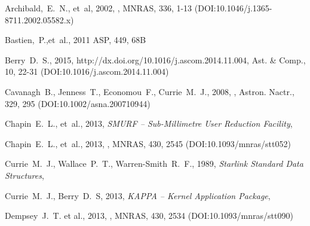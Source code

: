 \documentclass[11pt,oneside,chapters]{starlink}
\begin{document}
\newpage

\newpage

\newpage

\newpage

\newpage

\newpage

\newpage
\begin{thebibliography}{}



Archibald,~E.~N., et~al, 2002, , MNRAS, 336, 1-13
(DOI:10.1046/j.1365-8711.2002.05582.x)

Bastien,~P.,et~al., 2011   ASP, 449, 68B 

Berry~D.~S.,  2015,
{http://dx.doi.org/10.1016/j.ascom.2014.11.004},
Ast. \& Comp., 10, 22-31 (DOI:10.1016/j.ascom.2014.11.004)

Cavanagh~B., Jenness~T., Economou~F., Currie~M.~J., 2008,
, Astron. Nactr., 329, 295
(DOI:10.1002/asna.200710944)

Chapin~E.~L., et~al., 2013, \textit{SMURF -- Sub-Millimetre User Reduction
Facility}, 

Chapin~E.~L., et~al., 2013,
,
MNRAS, 430, 2545 (DOI:10.1093/mnras/stt052)

Currie~M.~J., Wallace~P.~T., Warren-Smith~R.~F., 1989,
\textit{Starlink Standard Data Structures}, 

Currie~M.~J., Berry~D.~S, 2013, \textit{KAPPA -- Kernel Application Package},

Dempsey~J.~T. et al., 2013, ,
MNRAS, 430, 2534 (DOI:10.1093/mnras/stt090)


\end{thebibliography}
\end{document}
